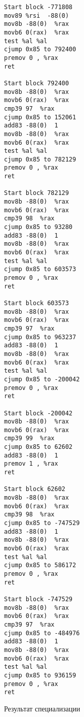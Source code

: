 \documentclass{spbau-diploma}
\begin{document}
\begin{figure}
\begin{multicols}{2}
\begin{lstlisting}
Start block -771808
mov89 %rsi  -88(0) 
mov8b -88(0)  %rax 
movb6 0(rax)  %rax 
test %al %al
cjump 0x85 to 792400
premov 0 , %rax 
ret

Start block 792400
mov8b -88(0)  %rax 
movb6 0(rax)  %rax 
cmp39 97  %rax 
cjump 0x85 to 152061
add83 -88(0)  1
mov8b -88(0)  %rax 
movb6 0(rax)  %rax 
test %al %al
cjump 0x85 to 782129
premov 0 , %rax 
ret

Start block 782129
mov8b -88(0)  %rax 
movb6 0(rax)  %rax 
cmp39 98  %rax 
cjump 0x85 to 93280
add83 -88(0)  1
mov8b -88(0)  %rax 
movb6 0(rax)  %rax 
test %al %al
cjump 0x85 to 603573
premov 0 , %rax 
ret

Start block 603573
mov8b -88(0)  %rax 
movb6 0(rax)  %rax 
cmp39 97  %rax 
cjump 0x85 to 963237
add83 -88(0)  1
mov8b -88(0)  %rax 
movb6 0(rax)  %rax 
test %al %al
cjump 0x85 to -200042
premov 0 , %rax 
ret

Start block -200042
mov8b -88(0)  %rax 
movb6 0(rax)  %rax 
cmp39 99  %rax 
cjump 0x85 to 62602
add83 -88(0)  1
premov 1 , %rax 
ret

Start block 62602
mov8b -88(0)  %rax 
movb6 0(rax)  %rax 
cmp39 98  %rax 
cjump 0x85 to -747529
add83 -88(0)  1
mov8b -88(0)  %rax 
movb6 0(rax)  %rax 
test %al %al
cjump 0x85 to 586172
premov 0 , %rax 
ret

Start block -747529
mov8b -88(0)  %rax 
movb6 0(rax)  %rax 
cmp39 97  %rax 
cjump 0x85 to -484976
add83 -88(0)  1
mov8b -88(0)  %rax 
movb6 0(rax)  %rax 
test %al %al
cjump 0x85 to 936159
premov 0 , %rax 
ret
\end{lstlisting}
\end{multicols}
\caption{ Результат специализации}
\label{fig:speckmp}
\end{figure}
\end{document}
